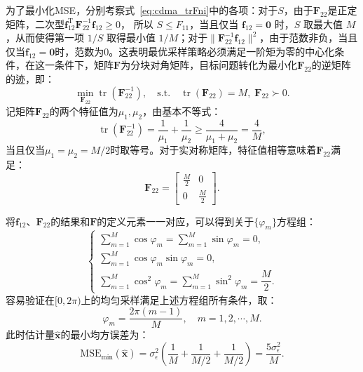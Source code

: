 为了最小化MSE，分别考察式~\eqref{eq:cdma_trFni}中的各项：对于$S$，由于$\bm{F}_{22}$是正定矩阵，二次型$\bm{f}_{12}^{\mathrm{T}} \bm{F}_{22}^{-1} \bm{f}_{12} \ge 0$，
所以 $S \le F_{11}$，当且仅当 $\bm{f}_{12} = \mathbf{0}$ 时，$S$ 取最大值 $M$，从而使得第一项 $1/S$ 取得最小值 $1/M$；对于$\| \bm{F}_{22}^{-1} \bm{f}_{12} \|^2$，由于范数非负，当且仅当$\bm{f}_{12} = \mathbf{0}$时，范数为$0$。这表明最优采样策略必须满足一阶矩为零的中心化条件，在这一条件下，矩阵$\bm F$为分块对角矩阵，目标问题转化为最小化$\bm{F}_{22}$的逆矩阵的迹，即：
\begin{equation}
	\min_{\bm{F}_{22}} \operatorname{tr}(\bm F_{22}^{-1}), \quad 
	\text{s.t.} \quad \operatorname{tr}(\bm{F}_{22}) = M, \; \bm{F}_{22} \succ 0.
\end{equation}
记矩阵$\bm F_{22}$的两个特征值为$\mu_1, \mu_2$，由基本不等式：
\begin{equation}
	\operatorname{tr}(\bm{F}_{22}^{-1}) = 
	\frac{1}{\mu_1}+\frac{1}{\mu_2}
	\ge \frac{4}{\mu_1 + \mu_2} = \frac{4}{M},
\end{equation}
当且仅当$\mu_1= \mu_2= M/2$时取等号。对于实对称矩阵，特征值相等意味着$\bm F_{22}$满足：
\begin{equation}
	\bm F_{22} = 
	\begin{bmatrix}
		\frac{M}{2} & 0 \\ 0 & \frac{M}{2}
	\end{bmatrix}.
\end{equation}

将$\bm f_{12}$、$\bm F_{22}$的结果和$\bm F$的定义元素一一对应，可以得到关于$\{\varphi_m\}$方程组：
\begin{equation}
	\begin{cases}
		\displaystyle \sum_{m=1}^{M} \cos \varphi_m = \sum_{m=1}^{M} \sin \varphi_m = 0, \\
		\displaystyle \sum_{m=1}^{M} \cos \varphi_m \sin \varphi_m = 0, \\
		\displaystyle \sum_{m=1}^{M} \cos^2 \varphi_m = \sum_{m=1}^{M} \sin^2 \varphi_m = \dfrac{M}{2}.
	\end{cases}
\end{equation}
容易验证在$[0,2\pi)$上的均匀采样满足上述方程组所有条件，取：
\begin{equation}
	\varphi_m = \frac{2\pi(m-1)}{M}, \quad m=1, 2, \cdots, M.
\end{equation}
此时估计量$\hat{\bm x}$的最小均方误差为：
\begin{equation}
	\mathrm{MSE}_{\min} (\hat{\bm x})
	= \sigma_\epsilon^2(\frac{1}{M} + \frac{1}{M/2} + \frac{1}{M/2})
	= \frac{5\sigma_\epsilon^2}{M}.
\end{equation}

